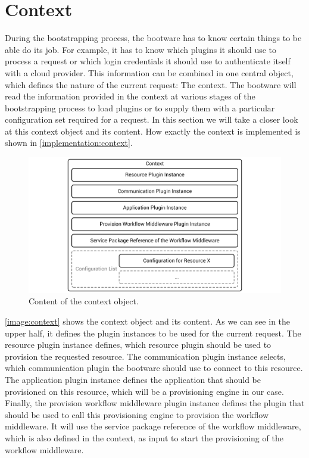 \section{Context}
\label{design:context}

During the bootstrapping process, the bootware has to know certain things to be able do its job.
For example, it has to know which plugins it should use to process a request or which login credentials it should use to authenticate itself with a cloud provider.
This information can be combined in one central object, which defines the nature of the current request: The context.
The bootware will read the information provided in the context at various stages of the bootstrapping process to load plugins or to supply them with a particular configuration set required for a request.
In this section we will take a closer look at this context object and its content.
How exactly the context is implemented is shown in \autoref{implementation:context}.

\begin{figure}[!htbp]
	\centering
	\includegraphics[resolution=600]{design/assets/context}
	\caption{Content of the context object.}
	\label{image:context}
\end{figure}

\autoref{image:context} shows the context object and its content.
As we can see in the upper half, it defines the plugin instances to be used for the current request.
The resource plugin instance defines, which resource plugin should be used to provision the requested resource.
The communication plugin instance selects, which communication plugin the bootware should use to connect to this resource.
The application plugin instance defines the application that should be provisioned on this resource, which will be a provisioning engine in our case.
Finally, the provision workflow middleware plugin instance defines the plugin that should be used to call this provisioning engine to provision the workflow middleware.
It will use the service package reference of the workflow middleware, which is also defined in the context, as input to start the provisioning of the workflow middleware.

